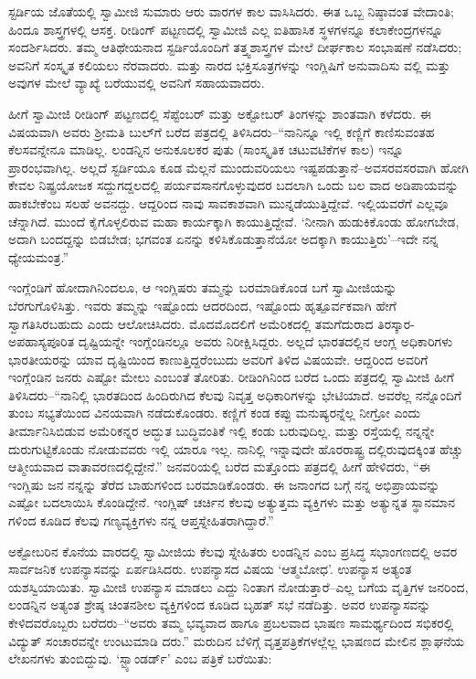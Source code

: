 ಸ್ಟರ್ಡಿಯ ಜೊತೆಯಲ್ಲಿ ಸ್ವಾಮೀಜಿ ಸುಮಾರು ಆರು ವಾರಗಳ ಕಾಲ ವಾಸಿಸಿದರು. ಈತ ಒಬ್ಬ ನಿಷ್ಠಾವಂತ ವೇದಾಂತಿ; ಹಿಂದೂ ಶಾಸ್ತ್ರಗಳಲ್ಲಿ ಆಸಕ್ತ. ರೀಡಿಂಗ್ ಪಟ್ಟಣದಲ್ಲಿ ಸ್ವಾಮೀಜಿ ಎಲ್ಲ ಐತಿಹಾಸಿಕ ಸ್ಥಳಗಳನ್ನೂ ಕಲಾಕೇಂದ್ರಗಳನ್ನೂ ಸಂದರ್ಶಿಸಿದರು. ತಮ್ಮ ಆತಿಥೇಯನಾದ ಸ್ಟರ್ಡಿಯೊಂದಿಗೆ ತತ್ತ್ವಶಾಸ್ತ್ರಗಳ ಮೇಲೆ ದೀರ್ಘಕಾಲ ಸಂಭಾಷಣೆ ನಡೆಸಿದರು; ಅವನಿಗೆ ಸಂಸ್ಕೃತ ಕಲಿಯಲು ನೆರವಾದರು. ಮತ್ತು ನಾರದ ಭಕ್ತಿಸೂತ್ರಗಳನ್ನು ಇಂಗ್ಲಿಷಿಗೆ ಅನುವಾದಿಸು ವಲ್ಲಿ ಮತ್ತು ಅವುಗಳ ಮೇಲೆ ವ್ಯಾಖ್ಯೆ ಬರೆಯುವಲ್ಲಿ ಅವನಿಗೆ ಸಹಾಯವಾದರು.

ಹೀಗೆ ಸ್ವಾಮೀಜಿ ರೀಡಿಂಗ್ ಪಟ್ಟಣದಲ್ಲಿ ಸೆಪ್ಟೆಂಬರ್ ಮತ್ತು ಅಕ್ಟೋಬರ್ ತಿಂಗಳನ್ನು ಶಾಂತವಾಗಿ ಕಳೆದರು. ಈ ವಿಷಯವಾಗಿ ಅವರು ಶ್ರೀಮತಿ ಬುಲ್​ಗೆ ಬರೆದ ಪತ್ರದಲ್ಲಿ ತಿಳಿಸಿದರು–“ನಾನಿನ್ನೂ ಇಲ್ಲಿ ಕಣ್ಣಿಗೆ ಕಾಣಿಸುವಂತಹ ಕೆಲಸವನ್ನೇನೂ ಮಾಡಿಲ್ಲ. ಲಂಡನ್ನಿನ ಅನುಕೂಲಕರ ಪುತು (ಸಾಂಸ್ಕೃತಿಕ ಚಟುವಟಿಕೆಗಳ ಕಾಲ) ಇನ್ನೂ ಪ್ರಾರಂಭವಾಗಿಲ್ಲ. ಅಲ್ಲದೆ ಸ್ಟರ್ಡಿಯೂ ಕೂಡ ಮೆಲ್ಲನೆ ಮುಂದುವರಿಯಲು ಇಷ್ಟಪಡುತ್ತಾನೆ–ಅವಸರವಸರವಾಗಿ ಹೋಗಿ ಕೇವಲ ನಿಷ್ಪ್ರಯೋಜಕ ಸದ್ದುಗದ್ದಲದಲ್ಲಿ ಪರ್ಯವಸಾನಗೊಳ್ಳುವುದರ ಬದಲಾಗಿ ಒಂದು ಬಲ ವಾದ ಅಡಿಪಾಯವನ್ನು ಹಾಕಬೇಕೆಂಬ ಸಲಹೆ ಅವನದ್ದು. ಆದ್ದರಿಂದ ನಾವು ಸಾವಕಾಶವಾಗಿ ಮುನ್ನಡೆಯುತ್ತಿದ್ದೇವೆ. ಇಲ್ಲಿಯವರೆಗೆ ಎಲ್ಲವೂ ಚೆನ್ನಾಗಿದೆ. ಮುಂದೆ ಕೈಗೊಳ್ಳಲಿರುವ ಮಹಾ ಕಾರ್ಯಕ್ಕಾಗಿ ಕಾಯುತ್ತಿದ್ದೇವೆ. ‘ನೀನಾಗಿ ಹುಡುಕಿಕೊಂಡು ಹೋಗಬೇಡ, ಅದಾಗಿ ಬಂದದ್ದನ್ನು ಬಿಡಬೇಡ; ಭಗವಂತ ಏನನ್ನು ಕಳಿಸಿಕೊಡುತ್ತಾನೆಯೋ ಅದಕ್ಕಾಗಿ ಕಾಯುತ್ತಿರು’–ಇದೇ ನನ್ನ ಧ್ಯೇಯಮಂತ್ರ.”

ಇಂಗ್ಲೆಂಡಿಗೆ ಹೋದಾಗಿನಿಂದಲೂ, ಆ ಇಂಗ್ಲಿಷರು ತಮ್ಮನ್ನು ಬರಮಾಡಿಕೊಂಡ ಬಗೆ ಸ್ವಾಮೀಜಿಯನ್ನು ಬೆರಗುಗೊಳಿಸಿತ್ತು. ಇವರು ತಮ್ಮನ್ನು ಇಷ್ಟೊಂದು ಆದರದಿಂದ, ಇಷ್ಟೊಂದು ಹೃತ್ಪೂರ್ವಕವಾಗಿ ಹೇಗೆ ಸ್ವಾಗತಿಸಿರಬಹುದು ಎಂದು ಆಲೋಚಿಸಿದರು. ಮೊದಮೊದಲಿಗೆ ಅಮೆರಿಕದಲ್ಲಿ ತಮಗೆದುರಾದ ತಿರಸ್ಕಾರ-ಅಪಹಾಸ್ಯಪೂರಿತ ದೃಷ್ಟಿಯನ್ನೇ ಇಂಗ್ಲೆಂಡಿನಲ್ಲೂ ಅವರು ನಿರೀಕ್ಷಿಸಿದ್ದರು. ಅಲ್ಲದೆ ಭಾರತದಲ್ಲಿನ ಆಂಗ್ಲ ಅಧಿಕಾರಿಗಳು ಭಾರತೀಯರನ್ನು ಯಾವ ದೃಷ್ಟಿಯಿಂದ ಕಾಣುತ್ತಿದ್ದರೆಂಬುದು ಅವರಿಗೆ ತಿಳಿದ ವಿಷಯವೇ. ಆದ್ದರಿಂದ ಅವರಿಗೆ ಇಂಗ್ಲೆಂಡಿನ ಜನರು ಎಷ್ಟೋ ಮೇಲು ಎಂಬಂತೆ ತೋರಿತು. ರೀಡಿಂಗಿನಿಂದ ಬರೆದ ಒಂದು ಪತ್ರದಲ್ಲಿ ಸ್ವಾಮೀಜಿ ಹೀಗೆ ತಿಳಿಸಿದರು–“ನಾನಿಲ್ಲಿ ಭಾರತದಿಂದ ಹಿಂದಿರುಗಿದ ಕೆಲವು ನಿವೃತ್ತ ಅಧಿಕಾರಿಗಳನ್ನು ಭೇಟಿಯಾದೆ. ಅವರೆಲ್ಲ ನನ್ನೊಂದಿಗೆ ತುಂಬ ಸಭ್ಯತೆಯಿಂದ ವಿನಯವಾಗಿ ನಡೆದುಕೊಂಡರು. ಕಣ್ಣಿಗೆ ಕಂಡ ಕಪ್ಪು ಮನುಷ್ಯರನ್ನೆಲ್ಲ ನೀಗ್ರೋ ಎಂದು ತೀರ್ಮಾನಿಸಿಬಿಡುವ ಅಮೆರಿಕನ್ನರ ಅದ್ಭುತ ಬುದ್ಧಿವಂತಿಕೆ ಇಲ್ಲಿ ಕಂಡು ಬರುವುದಿಲ್ಲ. ಮತ್ತು ರಸ್ತೆಯಲ್ಲಿ ನನ್ನನ್ನೇ ದುರುಗುಟ್ಟಿಕೊಂಡು ನೋಡುವವರು ಇಲ್ಲಿ ಯಾರೂ ಇಲ್ಲ. ನಾನಿಲ್ಲಿ ಇನ್ನಾವುದೇ ಹೊರರಾಷ್ಟ್ರ ದಲ್ಲಿರುವುದಕ್ಕಿಂತ ಹೆಚ್ಚು ಆತ್ಮೀಯವಾದ ವಾತಾವರಣದಲ್ಲಿದ್ದೇನೆ.” ಜನವರಿಯಲ್ಲಿ ಬರೆದ ಮತ್ತೊಂದು ಪತ್ರದಲ್ಲಿ ಹೀಗೆ ಹೇಳಿದರು, “ಈ ಇಂಗ್ಲಿಷು ಜನ ನನ್ನನ್ನು ತೆರೆದ ಬಾಹುಗಳಿಂದ ಬರಮಾಡಿಕೊಂಡರು. ಈ ಜನಾಂಗದ ಬಗ್ಗೆ ನನ್ನ ಅಭಿಪ್ರಾಯವನ್ನು ಎಷ್ಟೋ ಬದಲಾಯಿಸಿ ಕೊಂಡಿದ್ದೇನೆ. ಇಂಗ್ಲಿಷ್ ಚರ್ಚಿನ ಕೆಲವು ಅತ್ಯುತ್ತಮ ವ್ಯಕ್ತಿಗಳು ಮತ್ತು ಅತ್ಯುನ್ನತ ಸ್ಥಾನಮಾನ ಗಳಿಂದ ಕೂಡಿದ ಕೆಲವು ಗಣ್ಯವ್ಯಕ್ತಿಗಳು ನನ್ನ ಆಪ್ತಸ್ನೇಹಿತರಾಗಿದ್ದಾರೆ.”

ಅಕ್ಟೋಬರಿನ ಕೊನೆಯ ವಾರದಲ್ಲಿ ಸ್ವಾಮೀಜಿಯ ಕೆಲವು ಸ್ನೇಹಿತರು ಲಂಡನ್ನಿನ  ಎಂಬ ಪ್ರಸಿದ್ಧ ಸಭಾಂಗಣದಲ್ಲಿ ಅವರ ಸಾರ್ವಜನಿಕ ಉಪನ್ಯಾಸವನ್ನು ಏರ್ಪಡಿಸಿದರು. ಉಪನ್ಯಾಸದ ವಿಷಯ ‘ಆತ್ಮಬೋಧ’. ಉಪನ್ಯಾಸ ಅತ್ಯಂತ ಯಶಸ್ವಿಯಾಯಿತು. ಸ್ವಾಮೀಜಿ ಉಪನ್ಯಾಸ ಮಾಡಲು ಎದ್ದು ನಿಂತಾಗ ನೋಡುತ್ತಾರೆ–ಎಲ್ಲ ಬಗೆಯ ವೃತ್ತಿಗಳ ಜನರಿಂದ, ಲಂಡನ್ನಿನ ಅತ್ಯಂತ ಶ್ರೇಷ್ಠ ಚಿಂತನಶೀಲ ವ್ಯಕ್ತಿಗಳಿಂದ ಕೂಡಿದ ಬೃಹತ್ ಸಭೆ ನಡೆದಿತ್ತು. ಅವರ ಉಪನ್ಯಾಸವನ್ನು ಕೇಳಿದವರೊಬ್ಬರು ಬರೆದರು–“ಅವರು ತಮ್ಮ ಭವ್ಯವಾದ ಹಾಗೂ ಪ್ರಬಲವಾದ ಭಾಷಣ ಸಾಮರ್ಥ್ಯದಿಂದ ಸಭಿಕರಲ್ಲಿ ವಿದ್ಯುತ್ ಸಂಚಾರವನ್ನೇ ಉಂಟುಮಾಡಿ ದರು.” ಮರುದಿನ ಬೆಳಿಗ್ಗೆ ವೃತ್ತಪತ್ರಿಕೆಗಳಲ್ಲೆಲ್ಲ ಭಾಷಣದ ಮೇಲಿನ ಶ್ಲಾಘನೆಯ ಲೇಖನಗಳು ತುಂಬಿದ್ದುವು. ‘ಸ್ಟ್ಯಾಂಡರ್ಡ್​’ ಎಂಬ ಪತ್ರಿಕೆ ಬರೆಯಿತು:

